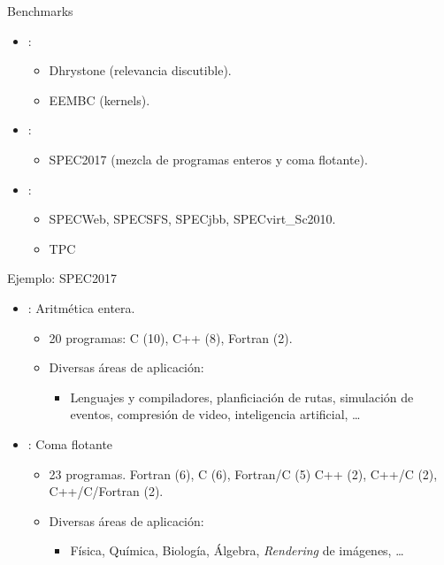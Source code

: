 \begin{frame}[t]{Benchmarks}
\begin{itemize}
  \item {}:
    \begin{itemize}
      \item Dhrystone (relevancia discutible).
      \item EEMBC (kernels).
    \end{itemize}
  \item {}:
    \begin{itemize}
      \item SPEC2017 (mezcla de programas enteros y coma flotante).
    \end{itemize}
  \item {}:
    \begin{itemize}
      \item SPECWeb, SPECSFS, SPECjbb, SPECvirt\_Sc2010.
      \item TPC
    \end{itemize}
\end{itemize}
\end{frame}

\begin{frame}[t]{Ejemplo: SPEC2017}
\begin{itemize}
  \item {}: Aritmética entera.
    \begin{itemize}
      \item 20 programas: C (10), C++ (8), Fortran (2).
      \item Diversas áreas de aplicación:
        \begin{itemize}
          \item Lenguajes y compiladores, 
                planficiación de rutas,
                simulación de eventos,
                compresión de video,
                inteligencia artificial, \ldots
        \end{itemize}
    \end{itemize}
  \item {}: Coma flotante
    \begin{itemize}
      \item 23 programas.
           Fortran (6),
           C (6),
           Fortran/C (5)
           C++ (2),
           C++/C (2),
           C++/C/Fortran (2).
      \item Diversas áreas de aplicación:
        \begin{itemize}
          \item Física, Química, Biología, Álgebra, \emph{Rendering} de imágenes,
                \ldots
        \end{itemize}
    \end{itemize}
\end{itemize}
\end{frame}
